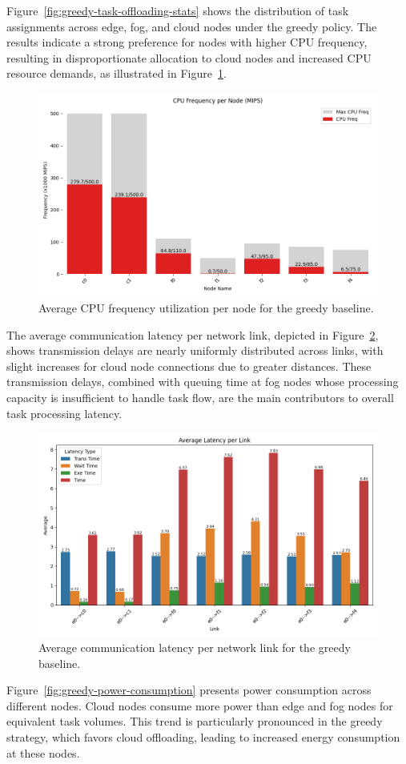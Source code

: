 \documentclass[preprint,3p,authoryear]{elsarticle}
\begin{document}
Figure~\ref{fig:greedy-task-offloading-stats} shows the distribution of task assignments across edge, fog, and cloud nodes under the greedy policy. The results indicate a strong preference for nodes with higher CPU frequency, resulting in disproportionate allocation to cloud nodes and increased CPU resource demands, as illustrated in Figure~\ref{fig:greedy-cpu-freq}.

\begin{figure}[H]
    \centering
    \includegraphics[width=0.5\linewidth]{figs/Greedy/cpu_frequency_per_node.png}
    \caption{Average CPU frequency utilization per node for the greedy baseline.}
    \label{fig:greedy-cpu-freq}
\end{figure}

The average communication latency per network link, depicted in Figure~\ref{fig:greedy-avg-latency}, shows transmission delays are nearly uniformly distributed across links, with slight increases for cloud node connections due to greater distances. These transmission delays, combined with queuing time at fog nodes whose processing capacity is insufficient to handle task flow, are the main contributors to overall task processing latency.

\begin{figure}[H]
    \centering
    \includegraphics[width=0.5\linewidth]{figs/Greedy/avg_latency_per_link.png}
    \caption{Average communication latency per network link for the greedy baseline.}
    \label{fig:greedy-avg-latency}
\end{figure}

Figure~\ref{fig:greedy-power-consumption} presents power consumption across different nodes. Cloud nodes consume more power than edge and fog nodes for equivalent task volumes. This trend is particularly pronounced in the greedy strategy, which favors cloud offloading, leading to increased energy consumption at these nodes.
\end{document}
